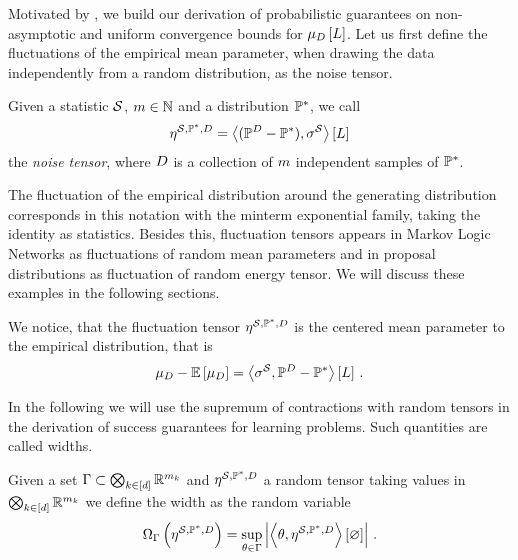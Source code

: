 
Motivated by , we build our derivation of probabilistic guarantees on non-asymptotic and uniform convergence bounds for $\mu_{D}\left[L\right]$.
Let us first define the fluctuations of the empirical mean parameter, when drawing the data independently from a random distribution, as the noise tensor.

\begin{definition}
    \label{def:noiseTensor}
    Given a statistic $\mathcal{S}$, $m\in\mathbb{N}$ and a distribution $\mathbb{P}^*$, we call
    \begin{align*}
        \eta^{\mathcal{S},\mathbb{P}^*,D} = \left\langle (\mathbb{P}^{D}-\mathbb{P}^*),\sigma^{\mathcal{S}}\right\rangle \left[ L \right]
    \end{align*}
    the \emph{noise tensor}, where $D$ is a collection of $m$ independent samples of $\mathbb{P}^*$.
\end{definition}

The fluctuation of the empirical distribution around the generating distribution corresponds in this notation with the minterm exponential family, taking the identity as statistics.
Besides this, fluctuation tensors appears in Markov Logic Networks as fluctuations of random mean parameters and in proposal distributions as fluctuation of random energy tensor.
We will discuss these examples in the following sections.


We notice, that the fluctuation tensor $\eta^{\mathcal{S},\mathbb{P}^*,D}$ is the centered mean parameter to the empirical distribution, that is
\begin{align*}
    \mu_{D} - \mathbb{E}\left[\mu_{D}\right] =  \left\langle \sigma^{\mathcal{S}},\mathbb{P}^{D}-\mathbb{P}^*\right\rangle \left[ L \right] \, .
\end{align*}

In the following we will use the supremum of contractions with random tensors in the derivation of success guarantees for learning problems.
Such quantities are called widths.

\begin{definition}
    \label{def:width}
    Given a set $\Gamma\subset\bigotimes_{k\in[d]} \mathbb{R}^{m_{k}}$ and $\eta^{\mathcal{S},\mathbb{P}^*,D}$ a random tensor taking values in $\bigotimes_{k\in[d]} \mathbb{R}^{m_{k}}$ we define the width as the random variable
    \[ \Omega_{\Gamma}\left(\eta^{\mathcal{S},\mathbb{P}^*,D}\right) = \sup_{\theta\in\Gamma} \left|\left\langle \theta,\eta^{\mathcal{S},\mathbb{P}^*,D}\right\rangle \left[ \varnothing \right]\right| \, . \]
\end{definition}

